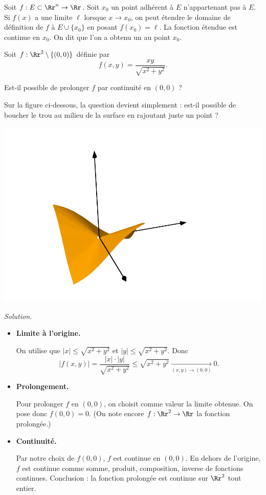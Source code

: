 \documentclass[11pt, class=report,crop=false]{standalone}
\begin{document}
\begin{definition}
Soit $f: E \subset \Rr^n \to \Rr$. Soit $x_0$ un point adhérent à $E$ 
n'appartenant pas à $E$. Si $f(x)$ a une limite $\ell$ lorsque $x \to x_0$,
on peut étendre le domaine de définition de $f$ à $E \cup \lbrace x_0 \rbrace$ en posant $f(x_0)=\ell$. 
La fonction étendue est continue en $x_0$. On dit que l'on a obtenu un  au point $x_0$.
\end{definition}


\begin{exemple}
Soit $f : \Rr^2 \setminus \{ (0,0) \}$ définie par 
$$f(x,y) = \frac{xy}{\sqrt{x^2+y^2}}.$$

Est-il possible de prolonger $f$ par continuité en $(0,0)$ ?

Sur la figure ci-dessous, la question devient simplement : est-il possible de 
boucher le trou au milieu de la surface en rajoutant juste un point ?
\begin{center}
\includegraphics[scale=0.3]{figures/fig-plusvar-34-01}  
\end{center}

\bigskip
\emph{Solution.}

\begin{itemize}
  \item \textbf{Limite à l'origine.}
  
  On utilise que $|x| \le \sqrt{x^2+y^2}$ et $|y| \le \sqrt{x^2+y^2}$.
  Donc
  $$| f(x,y) |  = \frac{|x| \cdot |y|}{\sqrt{x^2+y^2}}
  \le \sqrt{x^2+y^2} \xrightarrow[(x,y) \to (0,0)]{} 0.$$
  
  \item \textbf{Prolongement.}
  
  Pour prolonger $f$ en $(0,0)$, on choisit comme valeur la limite obtenue.  
  On pose donc $f(0,0) = 0$. (On note encore $f : \Rr^2 \to \Rr$ la fonction prolongée.) 
  
  \item \textbf{Continuité.}
  
  Par notre choix de $f(0,0)$, $f$ est continue en $(0,0)$.
  En dehors de l'origine, $f$ est continue comme somme, produit, composition, inverse de fonctions continues. 
  Conclusion : la fonction prolongée est continue sur $\Rr^2$ tout entier.
\end{itemize}  
\end{exemple}
\end{document}
